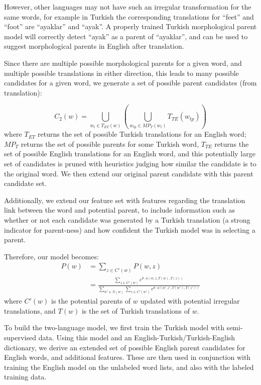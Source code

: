 \documentclass[11pt,twocolumn]{article}
\begin{document}
However, other languages may not have such an irregular transformation
for the same words, for example in Turkish the corresponding translations
for ``feet'' and ``foot'' are ``ayaklar'' and ``ayak''. A properly trained Turkish
morphological parent model will correctly detect ``ayak'' as a parent of ``ayaklar'',
and can be used to suggest morphological parents in English after translation.

Since there are multiple possible morphological parents for a given word, and multiple
possible translations in either direction, this leads to many possible candidates for a given word,
we generate a set of possible parent candidates (from translation):

\begin{equation}
    C_2(w) = \bigcup_{w_t \in T_{ET}(w)}\left(\bigcup_{w_{tp} \in MP_T (w_t)} T_{TE}(w_{tp})\right)
\end{equation}
where $T_{ET}$ returns the set of possible Turkish translations
for an English word; $MP_T$ returns the set of possible parents for some Turkish word,
$T_{TE}$ returns the set of possible English translations for an English word,
and this potentially large set of candidates is pruned with heuristics judging
how similar the candidate is to the original word. We then extend our original parent candidate
with this parent candidate set.

Additionally, we extend our feature set with features regarding the translation link between
the word and potential parent, to include information such as whether or not each candidate was
generated by a Turkish translation (a strong indicator for parent-ness) and how confident
the Turkish model was in selecting a parent.

Therefore, our model becomes:
\begin{equation}
    \begin{split}
        P(w) &= \sum_{z \in C'(w)} P(w,z) \\
             &= \frac{\sum_{z \in C'(w)} e^{\theta \cdot \phi(w, z, T(w), T(z))}}{\sum_{w' \in N(w)} \sum_{z \in C'(w')} e^{\theta \cdot \phi(w', z', T(w'), T(z'))}}
    \end{split}
\end{equation}
where $C'(w)$ is the potential parents of $w$ updated with potential irregular translations,
and $T(w)$ is the set of Turkish translations of $w$.

To build the two-language model, we first train the Turkish model with semi-supervised data.
Using this model and an English-Turkish/Turkish-English dictionary, we derive an extended
set of possible English parent candidates for English words, and additional features. 
These are then used in conjunction with training the English model on the unlabeled word lists,
and also with the labeled training data.
\end{document}
